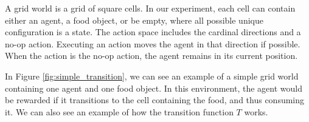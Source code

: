 \documentclass[12pt,A4]{report}
\theoremstyle{definition}
\begin{document}

A grid world is a grid of square cells. In our experiment, each cell can contain either an agent, a food object, or be empty, where all possible unique configuration is a state. The action space includes the cardinal directions and a no-op action. Executing an action moves the agent in that direction if possible. When the action is the no-op action, the agent remains in its current position. 

In Figure \ref{fig:simple_transition}, we can see an example of a simple grid world containing one agent and one food object. In this environment, the agent would be rewarded if it transitions to the cell containing the food, and thus consuming it. We can also see an example of how the transition function $T$ works. 

\end{document}

